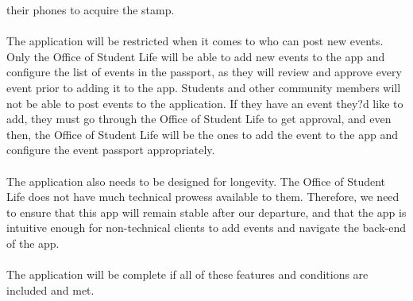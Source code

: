 \documentclass[draftclsnofoot, onecolumn, 10pt, compsoc]{IEEEtran}
\begin{document}
		their phones to acquire the stamp. \\ \\
		The application will be restricted when it comes to who can post new events. Only the Office of Student Life will be 
		able to add new events to the app and configure the list of events in the passport, as they will review and approve 
		every event prior to adding it to the app. Students and other community members will not be able to post events to the 
		application. If they have an event they?d like to add, they must go through the Office of Student Life to get approval, 
		and even then, the Office of Student Life will be the ones to add the event to the app and configure the event passport 
		appropriately. \\ \\
		The application also needs to be designed for longevity. The Office of Student Life does not have much technical 
		prowess available to them. Therefore, we need to ensure that this app will remain stable after our departure, and that 
		the app is intuitive enough for non-technical clients to add events and navigate the back-end of the app. \\ \\
		The application will be complete if all of these features and conditions are included and met.

	
\end{document}
